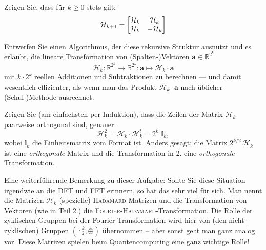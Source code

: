 \begin{flushenum}
\item Zeigen Sie, dass für $k \geq 0$ stets gilt:
\[
\mathcal{H}_{k+1} =
\begin{bmatrix}
\mathcal{H}_k & \mathcal{H}_k \cr
\mathcal{H}_k & - \mathcal{H}_k
\end{bmatrix}
\]

\item
Entwerfen Sie einen Algorithmus, der diese rekursive Struktur ausnutzt und es
erlaubt, die lineare Transformation von (Spalten-)Vektoren $\mathbf{a} \in
\mathbb{R}^{2^k}$
\[
\mathcal{H}_k :
\mathbb{R}^{2^k}\longrightarrow \mathbb{R}^{2^k}: 
\mathbf{a} \longmapsto\mathcal{H}_k \cdot \mathbf{a}
\]
mit $k \cdot 2^k$ reellen Additionen und Subtraktionen zu berechnen --- und
damit wesentlich effizienter, als wenn man das Produkt $\mathcal{H}_k \cdot
\mathbf{a}$ nach üblicher (Schul-)Methode ausrechnet.

\item Zeigen Sie (am einfachsten per Induktion), dass die Zeilen der Matrix
	$\mathcal{H}_k$ paarweise orthogonal sind, genauer:
\[
\mathcal{H}_k^2 = \mathcal{H}_k  \cdot \mathcal{H}_k^t = 2^k \,\, \mathbb{I}_k,
\]
wobei $\mathbb{I}_k$ die Einheitsmatrix vom Format ist.  Anders gesagt: die
Matrix $2^{k/2}\, \mathcal{H}_k$ ist eine \emph{orthogonale} Matrix und die
Transformation in 2. eine \emph{orthogonale} Transformation.
\end{flushenum}

Eine weiterführende Bemerkung zu dieser Aufgabe: Sollte Sie diese Situation
irgendwie an die DFT und FFT erinnern, so hat das sehr viel für sich.  Man
nennt die Matrizen $\mathcal{H}_k$ (spezielle) \textsc{Hadamard}-Matrizen und
die Transformation von Vektoren (wie in Teil 2.) die
\textsc{Fourier-Hadamard}-Transformation.  Die Rolle der zyklischen Gruppen bei
der Fourier-Transformation wird hier von (den nicht-zyklischen) Gruppen
$(\mathbb{F}_2^k,\oplus)$ übernommen -- aber sonst geht man ganz analog vor.
Diese Matrizen spielen beim Quantencomputing eine ganz wichtige Rolle!
